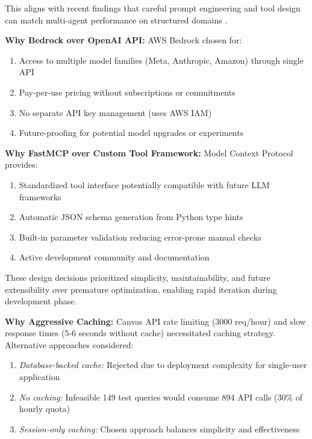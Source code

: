 \documentclass{article}
\begin{document}
This aligns with recent findings that careful prompt engineering and tool design can match multi-agent performance on structured domains \cite{chen2024llmma}.

\textbf{Why Bedrock over OpenAI API:} AWS Bedrock chosen for:

\begin{enumerate}
    \item Access to multiple model families (Meta, Anthropic, Amazon) through single API
    \item Pay-per-use pricing without subscriptions or commitments
    \item No separate API key management (uses AWS IAM)
    \item Future-proofing for potential model upgrades or experiments
\end{enumerate}

\textbf{Why FastMCP over Custom Tool Framework:} Model Context Protocol provides:

\begin{enumerate}
    \item Standardized tool interface potentially compatible with future LLM frameworks
    \item Automatic JSON schema generation from Python type hints
    \item Built-in parameter validation reducing error-prone manual checks
    \item Active development community and documentation
\end{enumerate}

These design decisions prioritized simplicity, maintainability, and future extensibility over premature optimization, enabling rapid iteration during development phase.

\textbf{Why Aggressive Caching:} Canvas API rate limiting (3000 req/hour) and slow response times (5-6 seconds without cache) necessitated caching strategy. Alternative approaches considered:

\begin{enumerate}
    \item \textit{Database-backed cache:} Rejected due to deployment complexity for single-user application
    \item \textit{No caching:} Infeasible 149 test queries would consume 894 API calls (30\% of hourly quota)
    \item \textit{Session-only caching:} Chosen approach balances simplicity and effectiveness
\end{enumerate}
\end{document}
